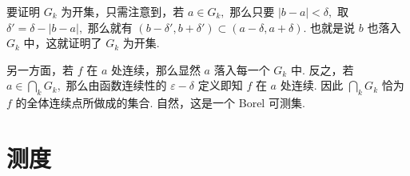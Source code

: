 \documentclass[12pt, a4paper, oneside]{book}
\numberwithin{figure}{section}
\theoremstyle{definition}
\begin{document}
要证明 $G_k$ 为开集，只需注意到，若 $a\in G_k,$ 那么只要 $|b-a|<\delta,$ 取 $\delta'=\delta-|b-a|,$ 那么就有 
$(b-\delta',b+\delta')\subset (a-\delta,a+\delta).$ 也就是说 $b$ 也落入 $G_k$ 中，这就证明了 $G_k$ 为开集. 

另一方面，若 $f$ 在 $a$ 处连续，那么显然 $a$ 落入每一个 $G_k$ 中. 反之，若 $a\in\bigcap_k G_k,$ 那么由函数连续性的 $\varepsilon-\delta$ 定义即知 $f$ 在 $a$ 处连续. 
因此 $\bigcap_k G_k$ 恰为 $f$ 的全体连续点所做成的集合. 自然，这是一个 Borel 可测集.









\section{测度}

\nocite{*}


\end{document}
